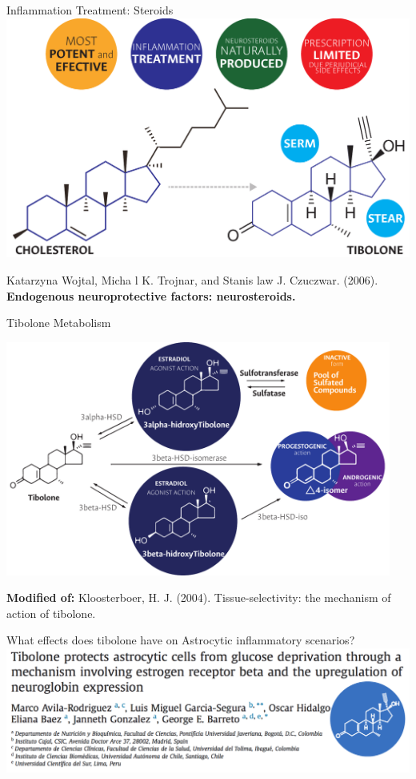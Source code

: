 \documentclass[11pt]{beamer}
\begin{document}
\begin{frame}{Inflammation Treatment: Steroids}
\includegraphics[width=\textwidth]{Steroids}
\begin{center}
{\scriptsize Katarzyna Wojtal, Micha l K. Trojnar, and Stanis law J. Czuczwar. (2006). \textbf{Endogenous neuroprotective factors: neurosteroids.}\\}
\end{center}
\end{frame}
\begin{frame}{Tibolone Metabolism}
\begin{center}
\includegraphics[width=0.95\textwidth]{TiboloneM}
\end{center}
{\scriptsize \textbf{Modified of:} Kloosterboer, H. J. (2004). Tissue-selectivity: the mechanism of action of tibolone.\\}
\end{frame}
\begin{frame}{What effects does tibolone have on Astrocytic inflammatory scenarios?}
\includegraphics[width=\textwidth]{Tibolone}
\end{frame}
\end{document}
